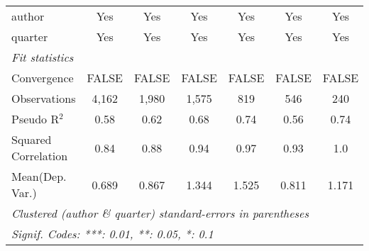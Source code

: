 \begin{tabular}{lcccccc}
   author                                                     & Yes           & Yes           & Yes           & Yes           & Yes           & Yes\\  
   quarter                                                    & Yes           & Yes           & Yes           & Yes           & Yes           & Yes\\  
   \midrule
   \emph{Fit statistics}\\
   Convergence                                                &FALSE          & FALSE         & FALSE         & FALSE         & FALSE         & FALSE\\  
   Observations                                               & 4,162         & 1,980         & 1,575         & 819           & 546           & 240\\  
   Pseudo R$^2$                                               & 0.58          & 0.62          & 0.68          & 0.74          & 0.56          & 0.74\\  
   Squared Correlation                                        & 0.84          & 0.88          & 0.94          & 0.97          & 0.93          & 1.0\\  
Mean(Dep. Var.) & 0.689 & 0.867 & 1.344 & 1.525 & 0.811 & 1.171 \\
   \midrule \midrule
   \multicolumn{7}{l}{\emph{Clustered (author \& quarter) standard-errors in parentheses}}\\
   \multicolumn{7}{l}{\emph{Signif. Codes: ***: 0.01, **: 0.05, *: 0.1}}\\
\end{tabular}
\par\endgroup
